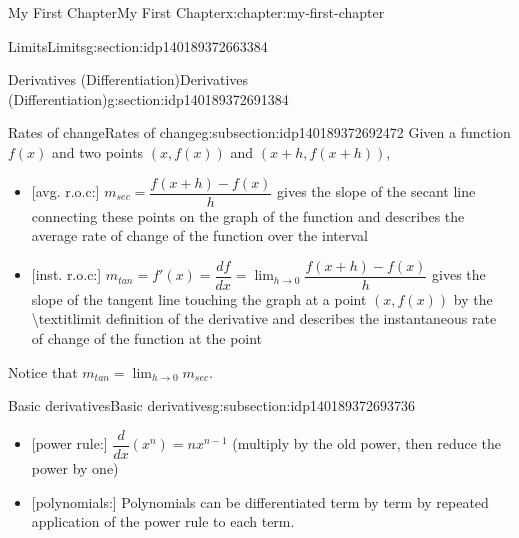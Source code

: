 \documentclass[oneside,10pt,]{book}
\begin{document}
\begin{chapterptx}{My First Chapter}{}{My First Chapter}{}{}{x:chapter:my-first-chapter}
\begin{sectionptx}{Limits}{}{Limits}{}{}{g:section:idp140189372663384}
\end{sectionptx}
%
%
\typeout{************************************************}
\typeout{************************************************}
%
\begin{sectionptx}{Derivatives (Differentiation)}{}{Derivatives (Differentiation)}{}{}{g:section:idp140189372691384}
%
%
\typeout{************************************************}
\typeout{************************************************}
%
\begin{subsectionptx}{Rates of change}{}{Rates of change}{}{}{g:subsection:idp140189372692472}
Given a function \(f(x)\) and two points \((x, f(x))\) and \((x+h, f(x+h))\),%
\begin{itemize}[label=\textbullet]
\item{}[avg. r.o.c:] \(\displaystyle m_{sec} = \dfrac{f(x+h)-f(x)}{h}\) gives the slope of the secant line connecting these points on the graph of the function and describes the average rate of change of the function over the interval%
\item{}[inst. r.o.c:] \(\displaystyle m_{tan} = f'(x) = \dfrac{df}{dx} = \lim_{h\to0} \dfrac{f(x+h)-f(x)}{h}\) gives the slope of the tangent line touching the graph at a point \((x, f(x))\) by the \textbackslash{}textit\textbraceleft{}limit definition of the derivative\textbraceright{} and describes the instantaneous rate of change of the function at the point%
\end{itemize}
Notice that \(\displaystyle m_{tan} = \lim_{h\to0} m_{sec}\).%
\end{subsectionptx}
%
%
\typeout{************************************************}
\typeout{************************************************}
%
\begin{subsectionptx}{Basic derivatives}{}{Basic derivatives}{}{}{g:subsection:idp140189372693736}
%
\begin{itemize}[label=\textbullet]
\item{}[power rule:] \(\dfrac{d}{dx}\left(x^n\right) = nx^{n-1}\) (multiply by the old power, then reduce the power by one)%
\item{}[polynomials:] Polynomials can be differentiated term by term by repeated application of the power rule to each term.%
\end{itemize}
\end{subsectionptx}
%
%
\typeout{************************************************}

\end{sectionptx}
\end{chapterptx}
\end{document}
